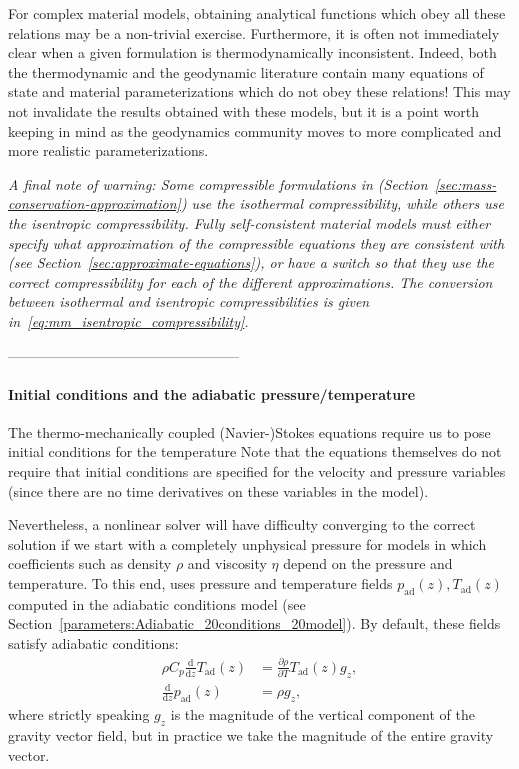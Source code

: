 For complex material models, obtaining analytical functions which obey all these relations
may be a non-trivial exercise. Furthermore, it is often not immediately clear when a
given formulation is thermodynamically inconsistent. Indeed, both the
thermodynamic and the geodynamic literature contain many equations of
state and material parameterizations which do not obey these 
relations! This may not invalidate the results obtained with these 
models, but it is a point worth keeping in mind as the geodynamics
community moves to more complicated and more realistic parameterizations.

\emph{A final note of warning: Some compressible formulations in \aspect{}
  (Section~\ref{sec:mass-conservation-approximation}) use the isothermal compressibility,
  while others use the isentropic compressibility. Fully self-consistent material models must
  either specify what approximation of the compressible equations they are consistent with
  (see Section~\ref{sec:approximate-equations}), or have a switch so that they use the correct
  compressibility for each of the different approximations. The conversion between isothermal
  and isentropic compressibilities is given in~\eqref{eq:mm_isentropic_compressibility}.}

--------------------------------------------------

\paragraph{Initial conditions and the adiabatic pressure/temperature}

The thermo-mechanically coupled (Navier-)Stokes 
equations require us to
pose initial conditions for the temperature
Note that the equations
themselves do not require that initial conditions are specified for
the velocity and pressure variables (since there are no time
derivatives on these variables in the model).

Nevertheless, a nonlinear solver will have difficulty converging to
the correct solution if we start with a completely unphysical pressure
for models in which coefficients such as density $\rho$ and viscosity
$\eta$ depend on the pressure and temperature. To this end, \aspect{}
uses pressure and temperature fields $p_{\textrm{ad}}(z),
T_{\textrm{ad}}(z)$ computed in the adiabatic conditions model
(see Section~\ref{parameters:Adiabatic_20conditions_20model}).
By default, these fields satisfy adiabatic conditions:
\begin{align}
\rho C_p \frac{\textrm{d}}{\textrm{d}z} T_{\textrm{ad}}(z)
&=
\frac{\partial\rho}{\partial T} T_{\textrm{ad}}(z) g_z,
\\
\frac{\textrm{d}}{\textrm{d}z} p_{\textrm{ad}}(z)
&=
\rho g_z,
\end{align}
where strictly speaking $g_z$ is the magnitude of the vertical
component of the gravity vector field, but in practice we take the
magnitude of the entire gravity vector.

